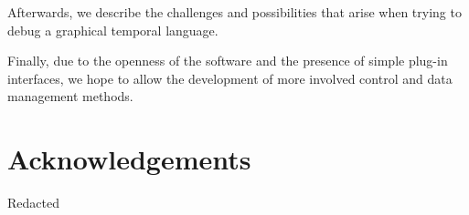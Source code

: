 \documentclass{sigchi}
\begin{document}
Afterwards, we describe the challenges and possibilities that arise when trying to debug a graphical temporal language.

Finally, due to the openness of the software and the presence of simple plug-in interfaces, we hope to allow the development of more involved control and data management methods.
\section{Acknowledgements}
Redacted



\end{document}
